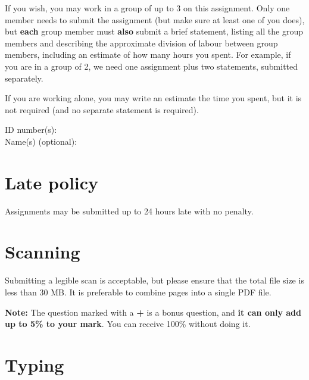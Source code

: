 \gdef\lecturenumber{a3}
\gdef\subsectioncounters{1}


\newcommand{\blanks}[1]{\ensuremath{\dashuline{\hspace{#1}}}}


\date{due: Wednesday, 22 March 2022}

If you wish, you may work in a group of up to 3 on this assignment.
Only one member needs to submit the assignment (but make sure at least one of you does),
but \textbf{each} group member must \textbf{also} submit a brief statement,
listing all the group members and describing
the approximate division of labour between group members, including an estimate of how
many hours you spent.  For example, if you are in a group of 2, we need one assignment
plus two statements, submitted separately.

If you are working alone, you may write an estimate the time you spent, but it is not required
(and no separate statement is required).

\bigskip

{\noindent ID number(s):} \\[1ex]

{\noindent Name(s) (optional):}


\section*{Late policy}

Assignments may be submitted up to 24 hours late with no penalty.


\section*{Scanning}

Submitting a legible scan is acceptable, but please ensure that the total file size is less than 30 MB.
It is preferable to combine pages into a single PDF file.

\vspace*{15ex}

\textbf{Note:} The question marked with a \textbf{+} is a bonus question,
and \textbf{it can only add up to 5\% to your mark}.
You can receive 100\% without doing it.

\clearpage


\section{Typing}

